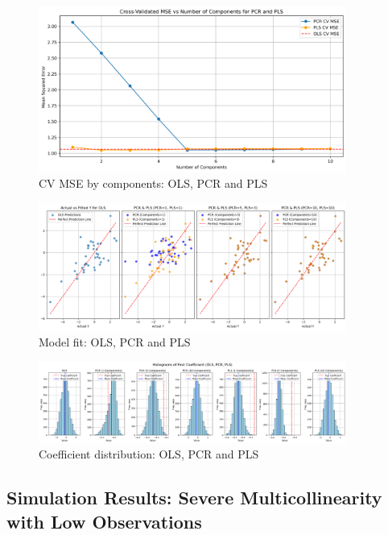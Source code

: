 \documentclass[11pt,twoside,a4paper]{article}
\begin{document}
\begin{figure}[H]
    \centering
    \includegraphics[width=0.9\textwidth]{Second_plot_second_simulation.png}
    \caption{CV MSE by components: OLS, PCR and PLS}
    \label{fig:Moderate_multicollinear_data_analysis}
\end{figure}

\begin{figure}[H]
    \centering
    \includegraphics[width=0.9\textwidth]{Third_plot_second_simulation.png}
    \caption{Model fit: OLS, PCR and PLS}
    \label{fig:Moderate_multicollinear_data_analysis}
\end{figure}

\begin{figure}[H]
    \centering
    \includegraphics[width=0.9\textwidth]{Fourth_plot_second_simulation.png}
    \caption{Coefficient distribution: OLS, PCR and PLS}
    \label{fig:Moderate_multicollinear_data_analysis}
\end{figure}

\subsection{Simulation Results: Severe Multicollinearity with Low Observations}
\end{document}
